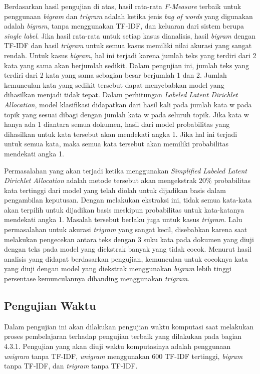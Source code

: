 \indent
Berdasarkan hasil pengujian di atas, hasil rata-rata {\itshape F-Measure} terbaik untuk penggunaan {\itshape bigram} dan {\itshape trigram} adalah ketika jenis {\itshape bag of words} yang digunakan adalah {\itshape bigram}, tanpa menggunakan TF-IDF, dan keluaran dari sistem berupa {\itshape single label}. Jika hasil rata-rata untuk setiap kasus dianalisis, hasil {\itshape bigram} dengan TF-IDF dan hasil {\itshape trigram} untuk semua kasus memiliki nilai akurasi yang sangat rendah. Untuk kasus {\itshape bigram}, hal ini terjadi karena jumlah teks yang terdiri dari 2 kata yang sama akan berjumlah sedikit. Dalam pengujian ini, jumlah teks yang terdiri dari 2 kata yang sama sebagian besar berjumlah 1 dan 2. Jumlah kemunculan kata yang sedikit tersebut dapat menyebabkan model yang dihasilkan menjadi tidak tepat. Dalam perhitungan {\itshape Labeled Latent Dirichlet Allocation}, model klasifikasi didapatkan dari hasil kali pada jumlah kata w pada topik yang sesuai dibagi dengan jumlah kata w pada seluruh topik. Jika kata w hanya ada 1 diantara semua dokumen, hasil dari model probabilitas yang dihasilkan untuk kata tersebut akan mendekati angka 1. Jika hal ini terjadi untuk semua kata, maka semua kata tersebut akan memiliki probabilitas mendekati angka 1. 

\indent
Permasalahan yang akan terjadi ketika menggunakan {\itshape Simplified Labeled Latent Dirichlet Allocation} adalah metode tersebut akan mengekstrak 20\% probabilitas kata tertinggi dari model yang telah diolah untuk dijadikan basis dalam pengambilan keputusan. Dengan melakukan ekstraksi ini, tidak semua kata-kata akan terpilih untuk dijadikan basis meskipun probabilitas untuk kata-katanya mendekati angka 1. Masalah tersebut berlaku juga untuk kasus {\itshape trigram}. Lalu permasalahan untuk akurasi {\itshape trigram} yang sangat kecil, disebabkan karena saat melakukan pengecekan antara teks dengan 3 suku kata pada dokumen yang diuji dengan teks pada model yang diekstrak banyak yang tidak cocok. Menurut hasil analisis yang didapat berdasarkan pengujian, kemunculan untuk cocoknya kata yang diuji dengan model yang diekstrak menggunakan {\itshape bigram} lebih tinggi persentase kemunculannya dibanding menggunakan {\itshape trigram}.

\subsection{Pengujian Waktu}
\indent
Dalam pengujian ini akan dilakukan pengujian waktu komputasi saat melakukan proses pembelajaran terhadap pengujian terbaik yang dilakukan pada bagian 4.3.1. Pengujian yang akan diuji waktu komputasinya adalah penggunaan {\itshape unigram} tanpa TF-IDF, {\itshape unigram} menggunakan 600 TF-IDF tertinggi, {\itshape bigram} tanpa TF-IDF, dan {\itshape trigram} tanpa TF-IDF.

